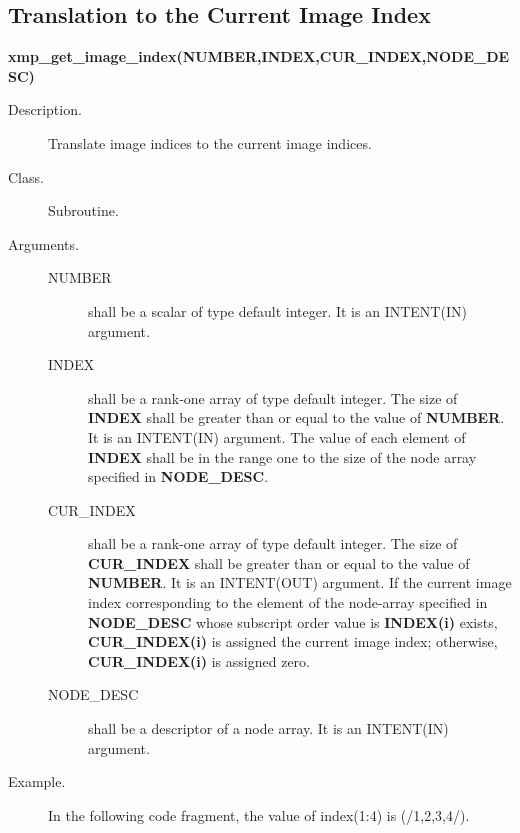 \subsection{Translation to the Current Image Index}

{\bf xmp\_get\_image\_index(NUMBER,INDEX,CUR\_INDEX,NODE\_DESC)}

\begin{description}
 \item[Description.] Translate image indices to the current image indices.

 \item[Class.] Subroutine.
	    
 \item[Arguments.] \hspace{1cm}
	    \begin{description}
	     \item[NUMBER] shall be a scalar of type default integer. It is an INTENT(IN) argument.
	     \item[INDEX] shall be a rank-one array of type default integer.
			The size of {\bfseries INDEX} shall be
			greater than or equal to the value of {\bfseries NUMBER}.
			It is an INTENT(IN) argument.
			The value of each element of {\bfseries INDEX} shall be in
			the range one
			to the size of the node array specified 
			in {\bfseries NODE\_DESC}.
	     \item[CUR\_INDEX] shall be a rank-one array of type default integer.
			The size of {\bfseries CUR\_INDEX} shall be
			greater than or equal to the value of {\bfseries NUMBER}.
			It is an INTENT(OUT) argument.
			If the current image index 
			corresponding to the element of the node-array
			specified in {\bfseries NODE\_DESC}
			whose subscript order value is {\bfseries INDEX(i)}
			exists,
			{\bfseries CUR\_INDEX(i)} is assigned the current image index;
			otherwise, {\bfseries CUR\_INDEX(i)} is assigned zero.
	     \item[NODE\_DESC] shall be a descriptor of a
			node array. It is an INTENT(IN) argument.
	    \end{description}

 \item[Example.] 
In the following code fragment, the value of {\ttfamily index(1:4)} is {\ttfamily (/1,2,3,4/)}.
\end{description}



